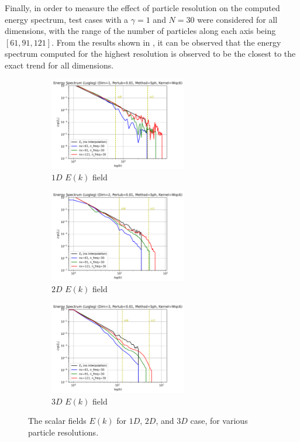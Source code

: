 Finally, in order to measure the effect of particle resolution on the computed energy spectrum, test cases with a $\gamma=1$ and $N=30$ were considered for all dimensions, with the range of the number of particles along each axis being $[61, 91, 121]$.
From the results shown in , it can be observed that the energy spectrum computed for the highest resolution is observed to be the closest to the exact trend for all dimensions.

\begin{figure}[H]
	\begin{subfigure}{7cm}
		\centering\includegraphics[width=6cm]{Code-Figures/sin-vel-prof-res/Energy Spectrum (Loglog) (Dim=1, Pertub=0.01, Method=Sph, Kernel=Wqc6).png}
		\caption{$1D$ $E(k)$ field}
	\end{subfigure}
	\begin{subfigure}{7cm}
		\centering\includegraphics[width=6cm]{Code-Figures/sin-vel-prof-res/Energy Spectrum (Loglog) (Dim=2, Pertub=0.01, Method=Sph, Kernel=Wqc6).png}
		\caption{$2D$ $E(k)$ field}
	\end{subfigure}
	\begin{subfigure}{7cm}
		\centering\includegraphics[width=6cm]{Code-Figures/sin-vel-prof-res/Energy Spectrum (Loglog) (Dim=3, Pertub=0.01, Method=Sph, Kernel=Wqc6).png}
		\caption{$3D$ $E(k)$ field}
	\end{subfigure}
	\caption{The scalar fields $E(k)$ for $1D$, $2D$, and $3D$ case, for various particle resolutions.}
	\label{fig:espec-scalar-fields-res}
\end{figure}


